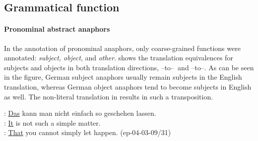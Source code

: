 \documentclass[output=paper]{LSP/langsci}
\begin{document}
\subsection{Grammatical function}
\label{sec:func}
\paragraph*{Pronominal abstract anaphors}


In the annotation of pronominal anaphors, only coarse-grained functions were annotated: \textit{subject, object}, and \textit{other}.  shows the translation equivalences for subjects and objects in both translation directions, \DEo--to--\ENt\ and \ENo--to--\DEt. As can be seen in the figure, German subject anaphors usually remain subjects in the English translation, whereas German object anaphors tend to become subjects in English as well.  The non-literal translation in  results in such a transposition.

\ea \label{ex:cat_pron} %
\DEo : \ul{Das} kann man nicht einfach so geschehen lassen.\\
\ENt : \ul{It} is not such a simple matter.\\
\DElit : \ul{That} you cannot simply let happen. \hfill{(ep-04-03-09/31)}
\z
\end{document}
